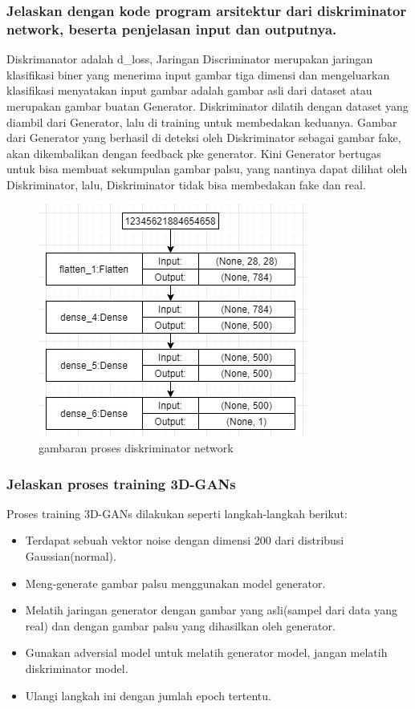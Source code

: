 \subsubsection{Jelaskan dengan kode program arsitektur dari diskriminator network, beserta penjelasan input dan outputnya.}
\hfill\break

Diskrimanator adalah d\_loss, Jaringan Discriminator merupakan jaringan klasifikasi biner yang menerima input gambar tiga dimensi dan mengeluarkan klasifikasi menyatakan input gambar adalah gambar asli dari dataset atau merupakan gambar buatan Generator. Diskriminator dilatih dengan dataset yang diambil dari Generator, lalu di training untuk membedakan keduanya. Gambar dari Generator yang berhasil di deteksi oleh Diskriminator sebagai gambar fake, akan dikembalikan dengan feedback pke generator. Kini Generator bertugas untuk bisa membuat sekumpulan gambar palsu, yang nantinya dapat dilihat oleh Diskriminator, lalu, Diskriminator tidak bisa membedakan fake dan real.
\begin{figure}[H]
	\centering
	\includegraphics[scale=0.5]{figures/1174067/8/4a.jpg}
	\caption{gambaran proses diskriminator network}
\end{figure}

\subsubsection{Jelaskan proses training 3D-GANs}
\hfill\break
Proses training 3D-GANs dilakukan seperti langkah-langkah berikut:
\begin{itemize}
	\item Terdapat sebuah vektor noise dengan dimensi 200 dari distribusi Gaussian(normal).
	\item Meng-generate gambar palsu menggunakan model generator.
	\item Melatih jaringan generator dengan gambar yang asli(sampel dari data yang real) dan dengan gambar palsu yang dihasilkan oleh generator.
	\item Gunakan adversial model untuk melatih generator model, jangan melatih diskriminator model.
	\item Ulangi langkah ini dengan jumlah epoch tertentu.
\end{itemize}


